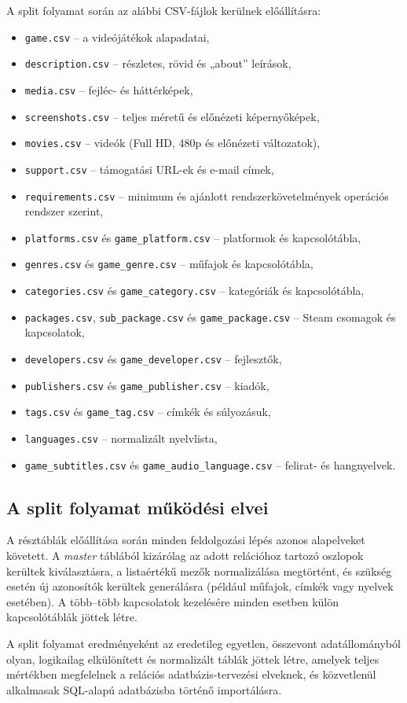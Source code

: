 A split folyamat során az alábbi CSV-fájlok kerülnek előállításra:
\begin{itemize}
    \item \texttt{game.csv} – a videójátékok alapadatai,
    \item \texttt{description.csv} – részletes, rövid és „about” leírások,
    \item \texttt{media.csv} – fejléc- és háttérképek,
    \item \texttt{screenshots.csv} – teljes méretű és előnézeti képernyőképek,
    \item \texttt{movies.csv} – videók (Full HD, 480p és előnézeti változatok),
    \item \texttt{support.csv} – támogatási URL-ek és e-mail címek,
    \item \texttt{requirements.csv} – minimum és ajánlott rendszerkövetelmények operációs rendszer szerint,
    \item \texttt{platforms.csv} és \texttt{game\_platform.csv} – platformok és kapcsolótábla,
    \item \texttt{genres.csv} és \texttt{game\_genre.csv} – műfajok és kapcsolótábla,
    \item \texttt{categories.csv} és \texttt{game\_category.csv} – kategóriák és kapcsolótábla,
    \item \texttt{packages.csv}, \texttt{sub\_package.csv} és \texttt{game\_package.csv} – Steam csomagok és kapcsolatok,
    \item \texttt{developers.csv} és \texttt{game\_developer.csv} – fejlesztők,
    \item \texttt{publishers.csv} és \texttt{game\_publisher.csv} – kiadók,
    \item \texttt{tags.csv} és \texttt{game\_tag.csv} – címkék és súlyozásuk,
    \item \texttt{languages.csv} – normalizált nyelvlista,
    \item \texttt{game\_subtitles.csv} és \texttt{game\_audio\_language.csv} – felirat- és hangnyelvek.
\end{itemize}

\subsection{A split folyamat működési elvei}

A résztáblák előállítása során minden feldolgozási lépés azonos alapelveket követett. A \textit{master} táblából kizárólag az adott relációhoz tartozó oszlopok kerültek kiválasztásra, a listaértékű mezők normalizálása megtörtént, és szükség esetén új azonosítók kerültek generálásra (például műfajok, címkék vagy nyelvek esetében). A több–több kapcsolatok kezelésére minden esetben külön kapcsolótáblák jöttek létre.

A split folyamat eredményeként az eredetileg egyetlen, összevont adatállományból olyan, logikailag elkülönített és normalizált táblák jöttek létre, amelyek teljes mértékben megfelelnek a relációs adatbázis-tervezési elveknek, és közvetlenül alkalmasak SQL-alapú adatbázisba történő importálásra.

